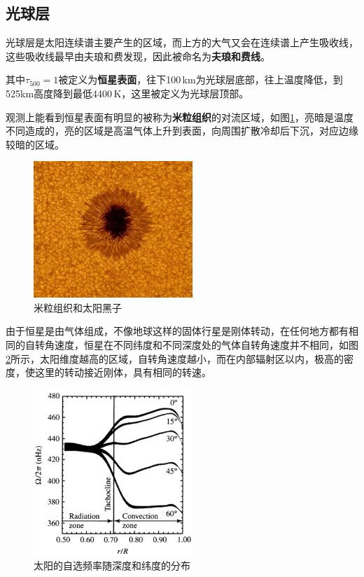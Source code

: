 \documentclass[openany]{ctexbook}
\begin{document}
\subsection{光球层}
光球层是太阳连续谱主要产生的区域，而上方的大气又会在连续谱上产生吸收线，这些吸收线最早由夫琅和费发现，因此被命名为\textbf{夫琅和费线}。

其中$\tau_{500}=1$被定义为\textbf{恒星表面}，往下100\,km为光球层底部，往上温度降低，到525km高度降到最低4400\,K，这里被定义为光球层顶部。

观测上能看到恒星表面有明显的被称为\textbf{米粒组织}的对流区域，如图\ref{fig:cell}，亮暗是温度不同造成的，亮的区域是高温气体上升到表面，向周围扩散冷却后下沉，对应边缘较暗的区域。

\begin{figure}[hbt]
  \centering
  \includegraphics[width=6cm]{chapters/11/cell}
  \caption{米粒组织和太阳黑子}
  \label{fig:cell}
\end{figure}

由于恒星是由气体组成，不像地球这样的固体行星是刚体转动，在任何地方都有相同的自转角速度，恒星在不同纬度和不同深度处的气体自转角速度并不相同，如图\ref{fig:rotaion}所示，太阳维度越高的区域，自转角速度越小，而在内部辐射区以内，极高的密度，使这里的转动接近刚体，具有相同的转速。

\begin{figure}[hbt]
  \centering
  \includegraphics[width=6cm]{chapters/11/rotation}
  \caption{太阳的自选频率随深度和纬度的分布}
  \label{fig:rotaion}
\end{figure}
\end{document}

